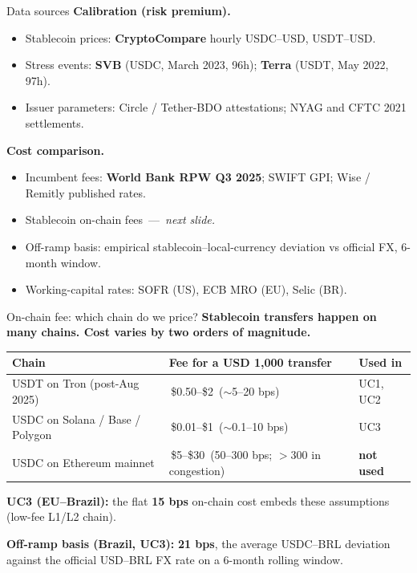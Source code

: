 \documentclass[aspectratio=169,11pt]{beamer}
\begin{document}
\begin{frame}{Data sources}
\small
\textbf{Calibration (risk premium).}
\begin{itemize}\itemsep1pt
  \item Stablecoin prices: \textbf{CryptoCompare} hourly USDC--USD, USDT--USD.
  \item Stress events: \textbf{SVB} (USDC, March 2023, 96h); \textbf{Terra} (USDT, May 2022, 97h).
  \item Issuer parameters: Circle / Tether-BDO attestations; NYAG and CFTC 2021 settlements.
\end{itemize}

\bigskip

\textbf{Cost comparison.}
\begin{itemize}\itemsep1pt
  \item Incumbent fees: \textbf{World Bank RPW Q3 2025}; SWIFT GPI; Wise / Remitly published rates.
  \item Stablecoin on-chain fees \,---\, \emph{next slide.}
  \item Off-ramp basis: empirical stablecoin--local-currency deviation vs official FX, 6-month window.
  \item Working-capital rates: SOFR (US), ECB MRO (EU), Selic (BR).
\end{itemize}
\end{frame}

\begin{frame}{On-chain fee: which chain do we price?}
\small
\textbf{Stablecoin transfers happen on many chains. Cost varies by two orders of magnitude.}

\medskip
\begin{center}
\renewcommand{\arraystretch}{1.2}
\begin{tabular}{lll}
\toprule
\textbf{Chain} & \textbf{Fee for a USD 1{,}000 transfer} & \textbf{Used in} \\
\midrule
USDT on Tron (post-Aug 2025)            & \,\$0.50--\$2 \,($\sim$5--20 bps)    & UC1, UC2 \\
USDC on Solana / Base / Polygon         & \,\$0.01--\$1 \,($\sim$0.1--10 bps)  & UC3 \\
USDC on Ethereum mainnet                & \,\$5--\$30 \,(50--300 bps; $>$300 in congestion) & \textbf{not used} \\
\bottomrule
\end{tabular}
\end{center}

\medskip
\textbf{UC3 (EU--Brazil):} the flat \textbf{15 bps} on-chain cost embeds these assumptions (low-fee L1/L2 chain).

\medskip
\textbf{Off-ramp basis (Brazil, UC3):} \textbf{21 bps}, the average USDC--BRL deviation against the official USD--BRL FX rate on a 6-month rolling window.
\end{frame}
\end{document}
